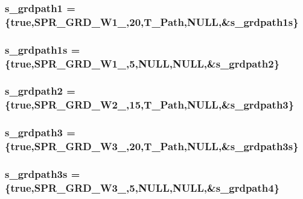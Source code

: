 \label{WL__ACT2_8C_a8e29ce2b8a415ba47460c294eda3b480}
\hypertarget{WL__ACT2_8C_a87bf01f7bc4f9914738de5504d6606d7}{
\subsubsection[{s\_\-grdpath1}]{ {\bf s\_\-grdpath1} = \{true,SPR\_\-GRD\_\-W1\_,20,T\_\-Path,NULL,\&{\bf s\_\-grdpath1s}\}}}
\label{WL__ACT2_8C_a87bf01f7bc4f9914738de5504d6606d7}
\hypertarget{WL__ACT2_8C_a5dbefbb7de0eb1b52d107e5ea95f3746}{
\subsubsection[{s\_\-grdpath1s}]{ {\bf s\_\-grdpath1s} = \{true,SPR\_\-GRD\_\-W1\_,5,NULL,NULL,\&{\bf s\_\-grdpath2}\}}}
\label{WL__ACT2_8C_a5dbefbb7de0eb1b52d107e5ea95f3746}
\hypertarget{WL__ACT2_8C_a35f7cee7d93affd65e4a22852cad2787}{
\subsubsection[{s\_\-grdpath2}]{ {\bf s\_\-grdpath2} = \{true,SPR\_\-GRD\_\-W2\_,15,T\_\-Path,NULL,\&{\bf s\_\-grdpath3}\}}}
\label{WL__ACT2_8C_a35f7cee7d93affd65e4a22852cad2787}
\hypertarget{WL__ACT2_8C_a7a25d80583843555aa0f656420dc0449}{
\subsubsection[{s\_\-grdpath3}]{ {\bf s\_\-grdpath3} = \{true,SPR\_\-GRD\_\-W3\_,20,T\_\-Path,NULL,\&{\bf s\_\-grdpath3s}\}}}
\label{WL__ACT2_8C_a7a25d80583843555aa0f656420dc0449}
\hypertarget{WL__ACT2_8C_ae062aa8aa55b457c49c9c80da5c3c3cb}{
\subsubsection[{s\_\-grdpath3s}]{ {\bf s\_\-grdpath3s} = \{true,SPR\_\-GRD\_\-W3\_,5,NULL,NULL,\&{\bf s\_\-grdpath4}\}}}
